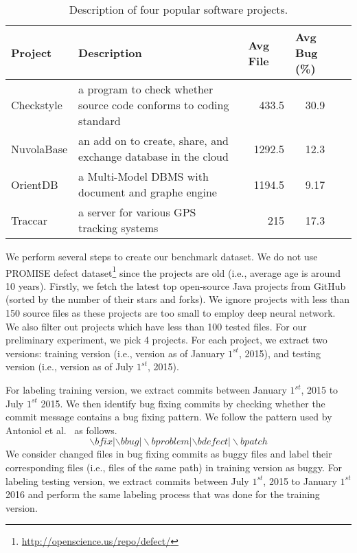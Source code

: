 \begin{table*}[t!]
	\centering
	\caption{Description of four popular software projects.}
	\begin{tabular}{|l|l|r|c|c|}
		\hline
		Project & \multicolumn{1}{l|}{Description}  & \multicolumn{1}{l|}{Avg File} & \multicolumn{1}{l|}{Avg Bug (\%)} \\
		\hline
		\hline
		Checkstyle  &  a program to check whether source code conforms to coding standard & 433.5 & 30.9 \\
		NuvolaBase &  an add on to create, share, and exchange database in the cloud     & 1292.5 & 12.3 \\
		OrientDB &  a Multi-Model DBMS with document and graphe engine  & 1194.5 & 9.17 \\
		Traccar &  a server for various GPS tracking systems & 215   & 17.3 \\
		\hline
	\end{tabular}%
	\label{tab:data}%
\end{table*}%

We perform several steps to create our benchmark dataset. We do not use PROMISE defect dataset\footnote{\url{http://openscience.us/repo/defect/}} since the projects are old (i.e., average age is around 10 years). Firstly, we fetch the latest top open-source Java projects from GitHub (sorted by the number of their stars and forks). We ignore projects with less than 150 source files as these projects are too small to employ deep neural network. We also filter out projects which have less than 100 tested files. For our preliminary experiment, we pick 4 projects. For each project, we extract two versions: training version (i.e., version as of January $1^{st}$, 2015), and testing version (i.e., version as of July $1^{st}$, 2015). 

For labeling training version, we extract commits between January $1^{st}$, 2015 to July $1^{st}$ 2015. We then identify bug fixing commits by checking whether the commit message contains a bug fixing pattern. We follow the pattern used by Antoniol et al.~\cite{antoniol2008bug} as follows.
\[
\backslash bfix|\backslash bbug|\backslash bproblem|\backslash bdefect|\backslash bpatch
\]
We consider changed files in bug fixing commits as buggy files and label their corresponding files (i.e., files of the same path) in training version as buggy. For labeling testing version, we extract commits between July $1^{st}$, 2015 to January $1^{st}$ 2016 and perform the same labeling process that was done for the training version.

